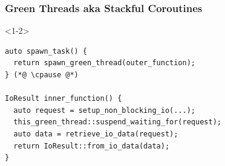 \documentclass[aspectratio=169]{beamer}
\newif\iftransitions
\newcommand{\cpause}{\iftransitions \pause \fi}
\begin{document}
\begin{frame}[fragile]
  \frametitle{Green Threads aka Stackful Coroutines}

  \begin{onlyenv}<1-2>
  \begin{lstlisting}[style=cpp20]
auto spawn_task() {
  return spawn_green_thread(outer_function);
} (*@ \cpause @*)

IoResult inner_function() {
  auto request = setup_non_blocking_io(...);
  this_green_thread::suspend_waiting_for(request);
  auto data = retrieve_io_data(request);
  return IoResult::from_io_data(data);
}
  \end{lstlisting}
  \end{onlyenv}

\end{frame}
\end{document}
